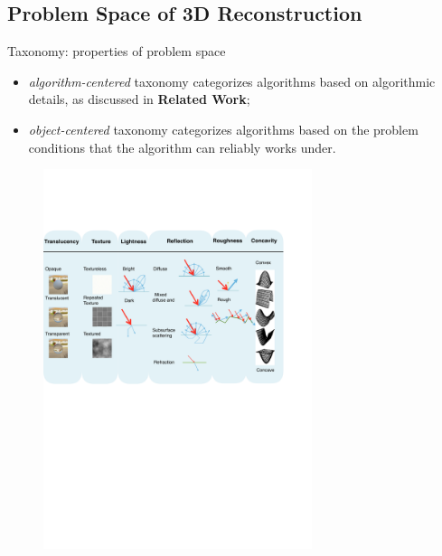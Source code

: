\documentclass[10pt]{beamer}
\begin{document}
\subsection{Problem Space of 3D Reconstruction}
\begin{frame}{Taxonomy: properties of problem space}

\begin{itemize}
\item \textit{algorithm-centered} taxonomy categorizes algorithms based on algorithmic details, as discussed in \textbf{Related Work};
\item \textit{object-centered} taxonomy categorizes algorithms based on the problem conditions that the algorithm can reliably works under.
\end{itemize}

\begin{figure}[h]
\includegraphics[width=0.7\textwidth]{taxo/obj_class}
\end{figure}

\end{frame}
\end{document}
